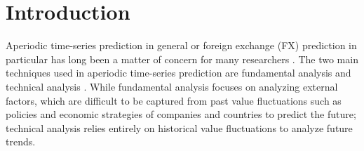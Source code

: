 \documentclass[aps,prb,groupedaddress,twocolumn,showpacs,dvipdfmx,superscriptaddress,pdftex]{revtex4-2}
\begin{document}
\section{Introduction}
\label{sec.intro}


Aperiodic time-series prediction in general or foreign exchange (FX) prediction in particular has long been a matter of concern for many researchers \citep{li2019multi, islam2021foreign, heryadi2021foreign}. The two main techniques used in aperiodic time-series prediction are fundamental analysis and technical analysis \cite{ayitey2023forex}. While fundamental analysis focuses on analyzing external factors, which are difficult to be captured from past value fluctuations such as policies and economic strategies of companies and countries to predict the future; technical analysis relies entirely on historical value fluctuations to analyze future trends.

\vspace{2mm}

\end{document}
